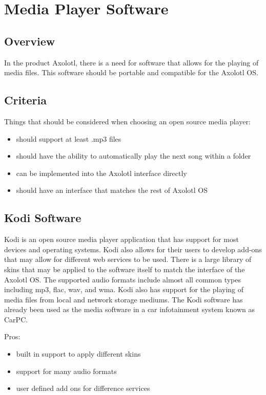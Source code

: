 \documentclass[onecolumn, draftclsnofoot,10pt, compsoc]{IEEEtran}
\begin{document}

\section{Media Player Software}
\subsection{Overview}
In the product Axolotl, there is a need for software that allows for the playing of media files. This software should be portable and compatible for the Axolotl OS.

\subsection{Criteria}
Things that should be considered when choosing an open source media player:
\begin{itemize}
    \item should support at least .mp3 files
    \item should have the ability to automatically play the next song within a folder
    \item can be implemented into the Axolotl interface directly
    \item should have an interface that matches the rest of Axolotl OS
\end{itemize}

\subsection{Kodi Software}
Kodi is an open source media player application that has support for most devices and operating systems. Kodi also allows for their users to develop add-ons that may allow for different web services to be used. There is a large library of skins that may be applied to the software itself to match the interface of the Axolotl OS. The supported audio formats include almost all common types including mp3, flac, wav, and wma. Kodi also has support for the playing of media files from local and network storage mediums. The Kodi software has already been used as the media software in a car infotainment system known as CarPC. 

Pros:
\begin{itemize}
    \item built in support to apply different skins
    \item support for many audio formats
    \item user defined add ons for difference services
\end{itemize}
\end{document}
